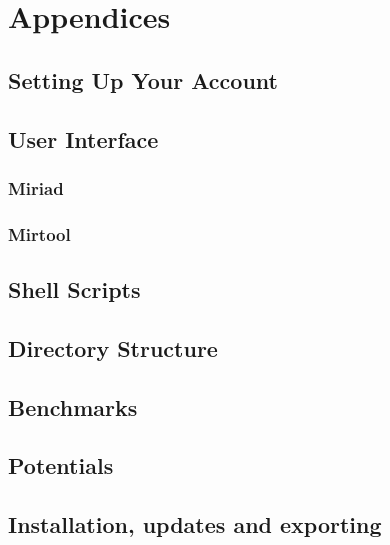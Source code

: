 \part{Appendices}
\chapter                {Setting Up Your Account}
 
\cleardoublepage
\chapter                {User Interface}
 
\section		{Miriad}
 
\section		{Mirtool}
 
\cleardoublepage
\chapter                {Shell Scripts}
 
\cleardoublepage
\chapter                {Directory Structure}
 
\cleardoublepage
\chapter                {Benchmarks}
 
\cleardoublepage
\chapter                {Potentials}
 
\cleardoublepage
\chapter                {Installation, updates and exporting}
 
\cleardoublepage
